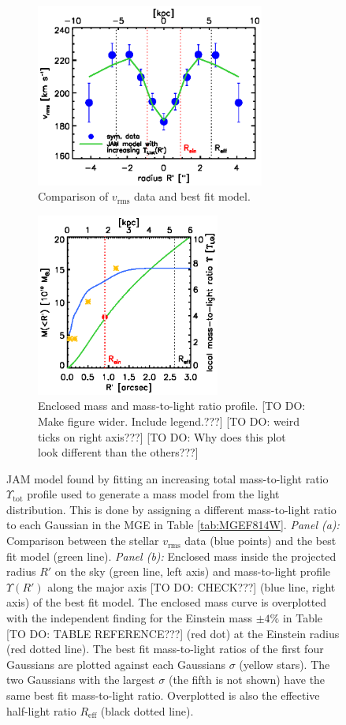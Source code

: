 
\begin{figure}
\centering
\begin{subfigure}{.5\textwidth}
  \centering
  \includegraphics[height=6cm]{fig/jam_G_vrms.ps}
  \caption{Comparison of $v_\text{rms}$ data and best fit model.}
  \label{fig:JAM_modelG}
\end{subfigure}%
\begin{subfigure}{.5\textwidth}
  \centering
  \includegraphics[height=6cm]{fig/jam_G_enclMass.ps}
  \caption{Enclosed mass and mass-to-light ratio profile. [TO DO: Make figure wider. Include legend.???] [TO DO: weird  ticks on right axis???] [TO DO: Why does this plot look different than the others???]}
  \label{fig:enclMass_modelG}
\end{subfigure}
\caption{JAM model found by fitting an increasing total mass-to-light ratio $\Upsilon_\text{tot}$ profile used to generate a mass model from the light distribution.  This is done by assigning a different mass-to-light ratio to each Gaussian in the MGE in Table \ref{tab:MGEF814W}. \emph{Panel (a):} Comparison between the stellar $v_\text{rms}$ data (blue points) and the best fit model (green line). \emph{Panel (b):} Enclosed mass inside the projected radius $R'$ on the sky (green line, left axis) and mass-to-light profile $\Upsilon(R')$ along the major axis [TO DO: CHECK???] (blue line, right axis) of the best fit model. The enclosed mass curve is overplotted with the independent finding for the Einstein mass $\pm 4 \%$ in Table [TO DO: TABLE REFERENCE???] (red dot) at the Einstein radius (red dotted line). The best fit mass-to-light ratios of the first four Gaussians are plotted against each Gaussians $\sigma$ (yellow stars). The two Gaussians with the largest $\sigma$ (the fifth is not shown) have the same best fit mass-to-light ratio. Overplotted is also the effective half-light ratio $R_\text{eff}$ (black dotted line).}
\label{fig:modelG}
\end{figure}

